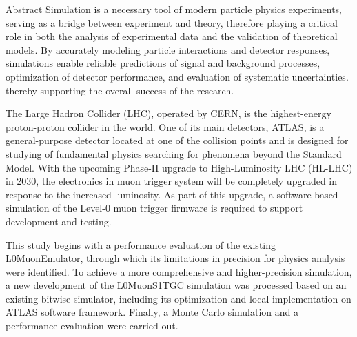 \begin{abstractpage}{Abstract}
    Simulation is a necessary tool of modern particle physics experiments, serving as a bridge between experiment and theory, therefore playing a critical role in both the analysis of experimental data and the validation of theoretical models. By accurately modeling particle interactions and detector responses, simulations enable reliable predictions of signal and background processes, optimization of detector performance, and evaluation of systematic uncertainties. thereby supporting the overall success of the research.

    The Large Hadron Collider (LHC), operated by CERN, is the highest-energy proton-proton collider in the world. One of its main detectors, ATLAS, is a general-purpose detector located at one of the collision points and is designed for studying of fundamental physics searching for phenomena beyond the Standard Model. With the upcoming Phase-II upgrade to High-Luminosity LHC (HL-LHC) in 2030, the electronics in muon trigger system will be completely upgraded in response to the increased luminosity. As part of this upgrade, a software-based simulation of the Level-0 muon trigger firmware is required to support development and testing. 

    This study begins with a performance evaluation of the existing L0MuonEmulator, through which its limitations in precision for physics analysis were identified. To achieve a more comprehensive and higher-precision simulation, a new development of the L0MuonS1TGC simulation was processed based on an existing bitwise simulator, including its optimization and local implementation on ATLAS software framework. Finally, a Monte Carlo simulation and a performance evaluation were carried out.
\end{abstractpage}
